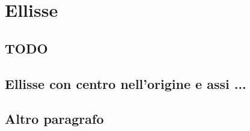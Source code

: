
\chapter{Ellisse}

\section{TODO}

\section{Ellisse con centro nell'origine e assi ...}
\label{sec:01_formacanonica}

% 

\section{Altro paragrafo}
\label{sec:02_altro}
